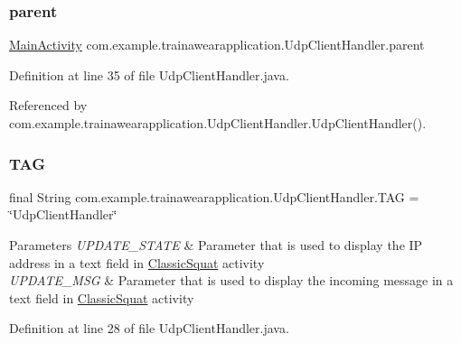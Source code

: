 \subsubsection{\texorpdfstring{parent}{parent}}
{\footnotesize\ttfamily \mbox{\hyperlink{classcom_1_1example_1_1trainawearapplication_1_1_main_activity}{Main\+Activity}} com.\+example.\+trainawearapplication.\+Udp\+Client\+Handler.\+parent\hspace{0.3cm}{\ttfamily [private]}}



Definition at line 35 of file Udp\+Client\+Handler.\+java.



Referenced by com.\+example.\+trainawearapplication.\+Udp\+Client\+Handler.\+Udp\+Client\+Handler().

\mbox{\label{classcom_1_1example_1_1trainawearapplication_1_1_udp_client_handler_a0d2c877a919491f82a2d6f473111a104}} 
\subsubsection{\texorpdfstring{TAG}{TAG}}
{\footnotesize\ttfamily final String com.\+example.\+trainawearapplication.\+Udp\+Client\+Handler.\+T\+AG = \char`\"{}Udp\+Client\+Handler\char`\"{}\hspace{0.3cm}{\ttfamily [package]}}


\begin{DoxyParams}{Parameters}
{\em U\+P\+D\+A\+T\+E\+\_\+\+S\+T\+A\+TE} & Parameter that is used to display the IP address in a text field in \mbox{\hyperlink{classcom_1_1example_1_1trainawearapplication_1_1_classic_squat}{Classic\+Squat}} activity \\
\hline
{\em U\+P\+D\+A\+T\+E\+\_\+\+M\+SG} & Parameter that is used to display the incoming message in a text field in \mbox{\hyperlink{classcom_1_1example_1_1trainawearapplication_1_1_classic_squat}{Classic\+Squat}} activity \\
\hline
\end{DoxyParams}


Definition at line 28 of file Udp\+Client\+Handler.\+java.



